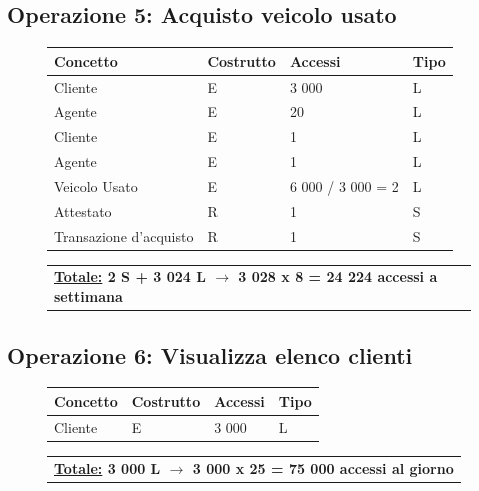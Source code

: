 \documentclass[a4paper,12pt]{report}
\begin{document}
\subsection*{Operazione 5: Acquisto veicolo usato}
\begin{figure}[H]
	\centering
	\begin{tabular}{L{4.5cm}C{2cm}C{4.5cm}C{2cm}}
		\rule[-2mm]{0mm}{0.6cm}{}
		\textbf{Concetto} & \textbf{Costrutto} &\textbf{Accessi} & \textbf{Tipo} \\
		\hline\rule[-2mm]{0mm}{0.65cm}{}
		Cliente & E & 3 000 & L \\
		\hline\rule[-2mm]{0mm}{0.65cm}{}
		Agente & E & 20 & L \\
		\hline\rule[-2mm]{0mm}{0.65cm}{}
		Cliente & E & 1 & L \\
		\hline\rule[-2mm]{0mm}{0.65cm}{}
		Agente & E & 1 & L \\
		\hline\rule[-2mm]{0mm}{0.65cm}{}
		Veicolo Usato & E & 6 000 / 3 000 = 2 & L \\
		\hline\rule[-2mm]{0mm}{0.65cm}{}
		Attestato & R & 1 & S \\
		\hline\rule[-2mm]{0mm}{0.65cm}{}
		Transazione d'acquisto& R & 1 & S \\
	\end{tabular}
	
	\begin{tabular}{C{14.4cm}}
		\rule[-3mm]{0mm}{0.85cm}{}	
		 \textbf{\underline{Totale:} 2 S +  3 024 L $\to$ 3 028 x 8 = 24 224 accessi a settimana}
	\end{tabular}
\end{figure}

\subsection*{Operazione 6: Visualizza elenco clienti}
\begin{figure}[H]
	\centering
	\begin{tabular}{L{4.5cm}C{2cm}C{4.5cm}C{2cm}}
		\rule[-2mm]{0mm}{0.6cm}{}
		\textbf{Concetto} & \textbf{Costrutto} &\textbf{Accessi} & \textbf{Tipo} \\
		\hline\rule[-2mm]{0mm}{0.65cm}{}
		Cliente & E & 3 000 & L \\
	\end{tabular}
	
	\begin{tabular}{C{14.3cm}}
		\rule[-3mm]{0mm}{0.85cm}{}	
		 \textbf{\underline{Totale:} 3 000 L $\to$ 3 000 x 25 = 75 000 accessi al giorno}
	\end{tabular}
\end{figure}
\end{document}
